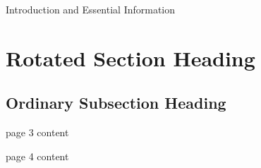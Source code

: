 \documentclass[12pt,foldmark]{leaflet}
\begin{document}
{Introduction and Essential Information}

\withrotationtrue
\section{Rotated Section Heading}
\withrotationfalse
\subsection{Ordinary Subsection Heading}
\newpage

page 3 content
\newpage

page 4 content
\newpage




\end{document}
